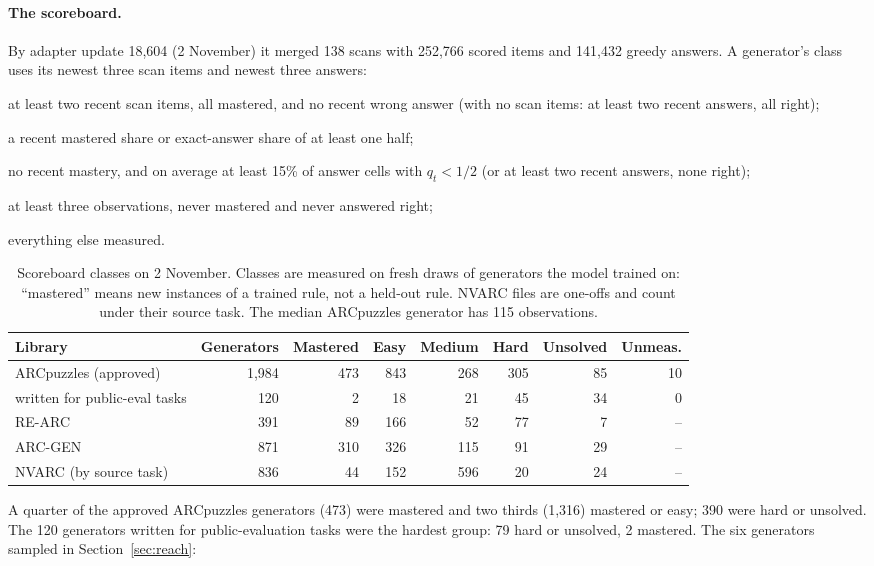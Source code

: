 \documentclass[11pt]{article}
\begin{document}
\paragraph{The scoreboard.} By adapter update 18,604 (2 November) it merged 138
scans with 252,766 scored items and 141,432 greedy answers. A generator's class
uses its newest three scan items and newest three answers:
\begin{description}[nosep,leftmargin=1.5em]
  \item[mastered:] at least two recent scan items, all mastered, and no recent wrong answer (with no scan items: at least two recent answers, all right);
  \item[easy:] a recent mastered share or exact-answer share of at least one half;
  \item[hard:] no recent mastery, and on average at least 15\% of answer cells with $q_t<1/2$ (or at least two recent answers, none right);
  \item[unsolved:] at least three observations, never mastered and never answered right;
  \item[medium:] everything else measured.
\end{description}

\begin{table}[H]
\centering
\small
\setlength{\tabcolsep}{4pt}
\begin{tabular}{lrrrrrrr}
\toprule
Library & Generators & Mastered & Easy & Medium & Hard & Unsolved & Unmeas. \\
\midrule
ARCpuzzles (approved) & 1,984 & 473 & 843 & 268 & 305 & 85 & 10 \\
\quad written for public-eval tasks & 120 & 2 & 18 & 21 & 45 & 34 & 0 \\
RE-ARC & 391 & 89 & 166 & 52 & 77 & 7 & -- \\
ARC-GEN & 871 & 310 & 326 & 115 & 91 & 29 & -- \\
NVARC (by source task) & 836 & 44 & 152 & 596 & 20 & 24 & -- \\
\bottomrule
\end{tabular}
\caption{Scoreboard classes on 2 November. Classes are measured on fresh draws
of generators the model trained on: ``mastered'' means new instances of a
trained rule, not a held-out rule. NVARC files are one-offs and count under
their source task. The median ARCpuzzles generator has 115 observations.}
\end{table}

A quarter of the approved ARCpuzzles generators (473) were mastered and two
thirds (1,316) mastered or easy; 390 were hard or unsolved. The 120 generators
written for public-evaluation tasks were the hardest group: 79 hard or unsolved,
2 mastered. The six generators sampled in Section~\ref{sec:reach}:
\end{document}
